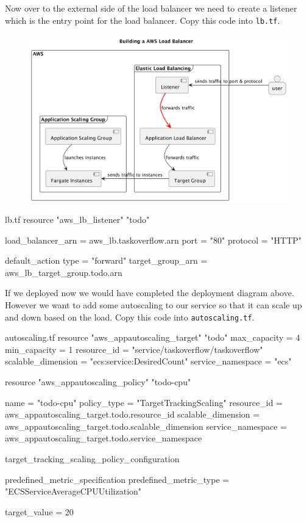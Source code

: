 \documentclass{csse4400}
\begin{document}
Now over to the external side of the load balancer we need to create a listener which is the entry point for the load balancer. Copy this code into \texttt{lb.tf}.

\begin{figure}[H]
  \begin{center}
    \includegraphics[scale=0.2]{diagrams/lb4fargate}
  \end{center}
\end{figure}

\begin{code}[language=terraform,numbers=none]{lb.tf}
resource "aws_lb_listener" "todo" {
  load_balancer_arn = aws_lb.taskoverflow.arn
  port              = "80"
  protocol          = "HTTP"

  default_action {
    type             = "forward"
    target_group_arn = aws_lb_target_group.todo.arn
  }
}
\end{code}

If we deployed now we would have completed the deployment diagram above. However we want to add some autoscaling to our service so that it can scale up and down based on the load. Copy this code into \texttt{autoscaling.tf}.

\begin{code}[language=terraform,numbers=none]{autoscaling.tf}
resource "aws_appautoscaling_target" "todo" {
  max_capacity = 4
  min_capacity = 1
  resource_id = "service/taskoverflow/taskoverflow"
  scalable_dimension = "ecs:service:DesiredCount"
  service_namespace = "ecs"
}


resource "aws_appautoscaling_policy" "todo-cpu" {
  name = "todo-cpu"
  policy_type = "TargetTrackingScaling"
  resource_id = aws_appautoscaling_target.todo.resource_id
  scalable_dimension = aws_appautoscaling_target.todo.scalable_dimension
  service_namespace = aws_appautoscaling_target.todo.service_namespace

  target_tracking_scaling_policy_configuration {
    predefined_metric_specification {
      predefined_metric_type = "ECSServiceAverageCPUUtilization"
    }

    target_value = 20
  }
}
\end{code}
\end{document}
